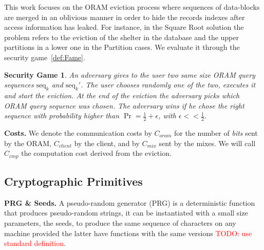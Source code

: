 \documentclass{llncs}
\newtheorem{privdef}{Privacy Definition}
\newtheorem*{secgme}{Security Game}
\newcommand{\todo}[1]{\textcolor{red}{TODO: #1}}
\begin{document}
This work focuses on the ORAM eviction process where sequences of data-blocks are merged in an oblivious manner in order to hide the records indexes after access information has leaked. For instance, in the Square Root solution the problem refers to the eviction of the shelter in the database and the upper partitions in a lower one in the Partition cases. We  evaluate it through the security game~\ref{def:Fame}.
%
\iffalse
\begin{privdef}
An ORAM eviction process is considered oblivious if an adversary cannot distinguish after eviction whether a specific record has been accessed.\\
That is to say, for the eviction of $s$ elements in an array of $n$ elements, and with $\epsilon =\mathcal{O}\left ( \frac{1}{n} \right )$, we have, $$ \forall i \in \llbracket 1, n \rrbracket,\ |\Pr(index_i \text{ was not retrieved} ) - \Pr(index_i \text{ was retrieved} )| \leq \epsilon$$
\label{def:Oblivious}
\end{privdef}
\fi
%
\begin{secgme}
An adversary gives to the user two same size ORAM query sequences $\text{seq}_k$ and $\text{seq}_k'$. The user chooses randomly one of the two, executes it and start the eviction. At the end of the eviction the adversary picks which ORAM query sequence was chosen. The adversary wins if he chose the right sequence with probability higher than $\Pr = \frac{1}{2}+\epsilon$, with $\epsilon<<\frac{1}{2}$.
\label{def:Game}
\end{secgme} 
%
\iffalse
\begin{privdef}{Eviction Old Security.}
An ORAM eviction process is considered secure if an adversary cannot distinguish after eviction the location of any specific record. 
\end{privdef}
\fi
%
\noindent\textbf{Costs.} We denote the communication costs by $C_{oram}$ for the number of \emph{bits} sent by the ORAM, $C_{client}$ by the client, and by $C_{mix}$ sent by the mixes. 
We will call $C_{cmp}$ the computation cost derived from the eviction.
%
\subsection{Cryptographic Primitives}
\noindent\textbf{PRG \& Seeds.}
A pseudo-random generator (PRG) is a deterministic function that produces pseudo-random strings, it can be instantiated with a small size parameters, the seeds, to produce the same sequence of characters on any machine provided the latter have functions with the same versions \todo{use standard definition}.\\\
\end{document}
